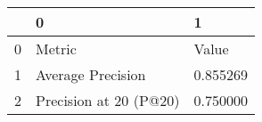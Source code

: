 \begin{tabular}{lll}
\toprule
 & 0 & 1 \\
\midrule
0 & Metric & Value \\
1 & Average Precision & 0.855269 \\
2 & Precision at 20 (P@20) & 0.750000 \\
\bottomrule
\end{tabular}
